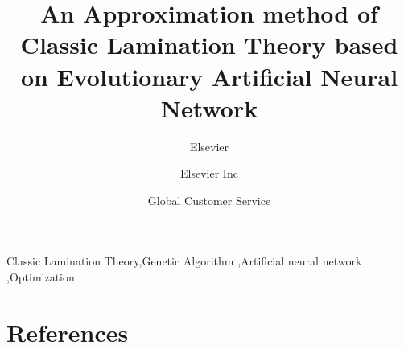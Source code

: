 \documentclass[review]{elsarticle}
\begin{document}
\begin{frontmatter}

\title{An Approximation method of Classic Lamination Theory based on Evolutionary Artificial Neural Network}

\author{Elsevier}
\address{Radarweg 29, Amsterdam}

\author[mymainaddress,mysecondaryaddress]{Elsevier Inc}

\author[mysecondaryaddress]{Global Customer Service}

\address[mymainaddress]{1600 John F Kennedy Boulevard, Philadelphia}
\address[mysecondaryaddress]{360 Park Avenue South, New York}

\begin{abstract}

\end{abstract}

\begin{keyword}
Classic Lamination Theory\sep Genetic Algorithm \sep Artificial neural network
\sep Optimization
\end{keyword}

\end{frontmatter}











\section*{References}


\end{document}
